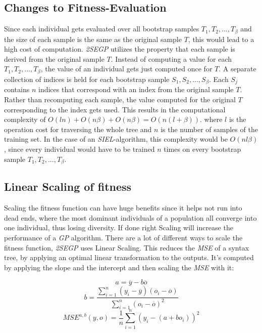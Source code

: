 \documentclass[tikz, runningheads]{llncs}
\begin{document}

\subsection{Changes to Fitness-Evaluation}
Since each individual gets evaluated over all bootstrap samples $T_1, T_2, ..., T_\beta$ and the size of each 
sample is the same as the original sample $T$, this would lead to a high cost of computation. \textit{2SEGP} utilizes 
the property that each sample is derived from the original sample $T$. Instead of computing a value for each 
$T_1, T_2, ..., T_\beta$, the value of an individual gets just computed once for $T$. A separate collection of 
indices is held for each bootstrap sample $S_1, S_2, ..., S_\beta$. Each $S_j$ contains $n$ indices that 
correspond with an index from the original sample $T$. Rather than recomputing each sample, the value computed for 
the original $T$ corresponding to the index gets used. This results in the computational complexity of 
$O(ln) + O(n\beta) + O(n\beta) = O(n(l + \beta))$. where $l$ is the operation cost for traversing the whole 
tree and $n$ is the number of samples of the training set. In the case of an \textit{SIEL}-algorithm, this complexity 
would be $O(nl\beta)$, since every individual would have to be trained $n$ times on every bootstrap sample 
$T_1, T_2, ..., T_\beta$.


\subsection{Linear Scaling of fitness}
Scaling the fitness function can have huge benefits since it helps not run into dead ends, where the 
most dominant individuals of a population all converge into one individual, thus losing diversity.
If done right Scaling will increase the performance of a \textit{GP} algorithm. There are a lot of 
different ways to scale the fitness function, \textit{2SEGP} uses Linear Scaling. 
This reduces the \textit{MSE} of a syntax tree, by applying an optimal linear transformation to the outputs. 
It's computed by applying the slope and the intercept and then scaling the \textit{MSE} with it:

\begin{equation}
	a = \overline{y} - b\overline{o}
\end{equation}
\begin{equation}
	b = \frac{\sum_{i = 1}^{n} (y_i - \overline{y})(o_i - \overline{o})}{\sum_{i = 1}^{n} (o_i - \overline{o})^2}
\end{equation}
\begin{equation}
	MSE^{a,b}(y, o) = \frac{1}{n} \sum_{i = 1}^{n} (y_i -(a + bo_i))^2
\end{equation}
\end{document}
